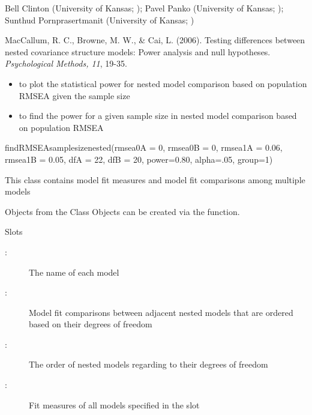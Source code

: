 \documentclass[a4paper]{book}
\begin{document}
%
\begin{Author}\relax
Bell Clinton (University of Kansas; ); Pavel Panko (University of Kansas; ); Sunthud Pornprasertmanit (University of Kansas; )
\end{Author}
%
\begin{References}\relax
MacCallum, R. C., Browne, M. W., \& Cai, L. (2006). Testing differences between nested covariance structure models: Power analysis and null hypotheses. \emph{Psychological Methods, 11}, 19-35.
\end{References}
%
\begin{SeeAlso}\relax
\begin{itemize}

\item {} to plot the statistical power for nested model comparison based on population RMSEA given the sample size
\item {} to find the power for a given sample size in nested model comparison based on population RMSEA

\end{itemize}

\end{SeeAlso}
%
\begin{Examples}
\begin{ExampleCode}
findRMSEAsamplesizenested(rmsea0A = 0, rmsea0B = 0, rmsea1A = 0.06, 
rmsea1B = 0.05, dfA = 22, dfB = 20, power=0.80, alpha=.05, group=1) 
\end{ExampleCode}
\end{Examples}
%
\begin{Description}\relax
This class contains model fit measures and model fit comparisons among multiple models
\end{Description}
%
\begin{Section}{Objects from the Class}
Objects can be created via the  function.
\end{Section}
%
\begin{Section}{Slots}
\begin{description}

\item[:] The name of each model
\item[:] Model fit comparisons between adjacent nested models that are ordered based on their degrees of freedom
\item[:] The order of nested models regarding to their degrees of freedom
\item[:] Fit measures of all models specified in the  slot

\end{description}

\end{Section}
\end{document}
